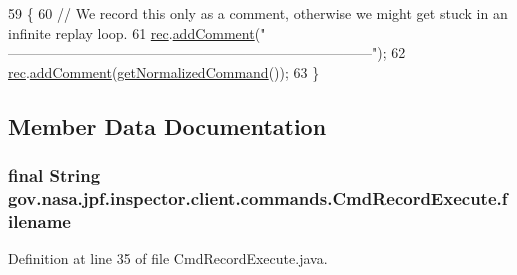 \begin{DoxyCode}
59                                                   \{
60     \textcolor{comment}{// We record this only as a comment, otherwise we might get stuck in an infinite replay loop.}
61     \hyperlink{classgov_1_1nasa_1_1jpf_1_1inspector_1_1client_1_1_client_command_af4246f2427035c72a6af45a2c61361f7}{rec}.\hyperlink{classgov_1_1nasa_1_1jpf_1_1inspector_1_1client_1_1_command_recorder_adee55e2460cc05a8acf16a7b0c89d3bd}{addComment}(\textcolor{stringliteral}{"
      ------------------------------------------------------------------------------"});
62     \hyperlink{classgov_1_1nasa_1_1jpf_1_1inspector_1_1client_1_1_client_command_af4246f2427035c72a6af45a2c61361f7}{rec}.\hyperlink{classgov_1_1nasa_1_1jpf_1_1inspector_1_1client_1_1_command_recorder_adee55e2460cc05a8acf16a7b0c89d3bd}{addComment}(\hyperlink{classgov_1_1nasa_1_1jpf_1_1inspector_1_1client_1_1commands_1_1_cmd_record_execute_ac18e7da35b73f01ae0b017ced58e264e}{getNormalizedCommand}());
63   \}
\end{DoxyCode}


\subsection{Member Data Documentation}
\subsubsection[{\texorpdfstring{filename}{filename}}]{\setlength{\rightskip}{0pt plus 5cm}final String gov.\+nasa.\+jpf.\+inspector.\+client.\+commands.\+Cmd\+Record\+Execute.\+filename\hspace{0.3cm}{\ttfamily [private]}}\hypertarget{classgov_1_1nasa_1_1jpf_1_1inspector_1_1client_1_1commands_1_1_cmd_record_execute_afb4cff074ad1e98dae860a1f74b83731}{}\label{classgov_1_1nasa_1_1jpf_1_1inspector_1_1client_1_1commands_1_1_cmd_record_execute_afb4cff074ad1e98dae860a1f74b83731}


Definition at line 35 of file Cmd\+Record\+Execute.\+java.

